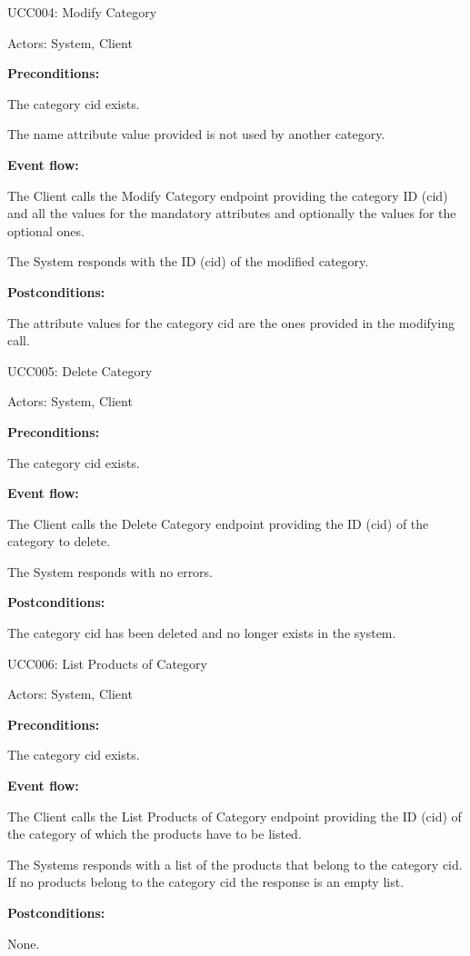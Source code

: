 \begin{ucbox}{UCC004: Modify Category}
\label{UCC004}

Actors: System, Client

\textbf{Preconditions:}

\ucitem The category cid exists.

\ucitem The name attribute value provided is not used by another category.

\textbf{Event flow:}

\ucitem The Client calls the Modify Category endpoint providing the category ID (cid) and all the values for the mandatory attributes and optionally the values for the optional ones.

\ucitem The System responds with the ID (cid) of the modified category.

\textbf{Postconditions:}

\ucitem The attribute values for the category cid are the ones provided in the modifying call.

\end{ucbox}

\begin{ucbox}{UCC005: Delete Category}
\label{UCC005}

Actors: System, Client

\textbf{Preconditions:}

\ucitem The category cid exists.

\textbf{Event flow:}

\ucitem The Client calls the Delete Category endpoint providing the ID (cid) of the category to delete.

\ucitem The System responds with no errors.

\textbf{Postconditions:}

\ucitem The category cid has been deleted and no longer exists in the system.

\end{ucbox}

\begin{ucbox}{UCC006: List Products of Category}
\label{UCC006}

Actors: System, Client

\textbf{Preconditions:}

\ucitem The category cid exists.

\textbf{Event flow:}

\ucitem The Client calls the List Products of Category endpoint providing the ID (cid) of the category of which the products have to be listed.

\ucitem The Systems responds with a list of the products that belong to the category cid. If no products belong to the category cid the response is an empty list.

\textbf{Postconditions:}

\ucitem None.

\end{ucbox}

